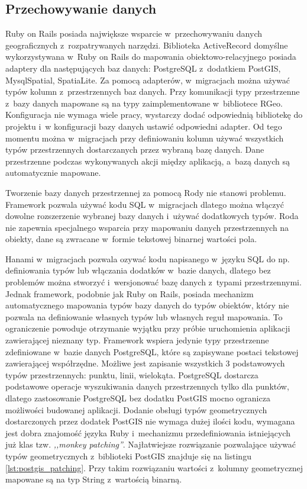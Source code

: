 \documentclass[printmode]{mgr}
\begin{document}
\subsection{Przechowywanie danych}

 Ruby on Rails posiada największe wsparcie w~przechowywaniu danych geograficznych z~rozpatrywanych narzędzi. Biblioteka ActiveRecord domyślne wykorzystywana w~Ruby on Rails do mapowania obiektowo-relacyjnego posiada adaptery dla następujących baz danych: PostgreSQL z~dodatkiem PostGIS, MysqlSpatial, SpatiaLite. Za pomocą adapterów, w~migracjach można używać typów kolumn z~przestrzennych baz danych. Przy komunikacji typy przestrzenne z~bazy danych mapowane są na typy zaimplementowane w~bibliotece RGeo. Konfiguracja nie wymaga wiele pracy, wystarczy dodać odpowiednią bibliotekę do projektu i~w konfiguracji bazy danych ustawić odpowiedni adapter. Od tego momentu można w~migracjach przy definiowaniu kolumn używać wszystkich typów przestrzennych dostarczanych przez wybraną bazę danych. Dane przestrzenne podczas wykonywanych akcji między aplikacją, a~bazą danych są automatycznie mapowane.

 Tworzenie bazy danych przestrzennej za pomocą Rody nie stanowi problemu. Framework pozwala używać kodu SQL w~migracjach dlatego można włączyć dowolne rozszerzenie wybranej bazy danych i~używać dodatkowych typów. Roda nie zapewnia specjalnego wsparcia przy mapowaniu danych przestrzennych na obiekty, dane są zwracane w~formie tekstowej binarnej wartości pola.

 Hanami w~migracjach pozwala ozywać kodu napisanego w~języku SQL do np. definiowania typów lub włączania dodatków w~bazie danych, dlatego bez problemów można stworzyć i~wersjonować bazę danych z~typami przestrzennymi. Jednak framework, podobnie jak Ruby on Rails, posiada mechanizm automatycznego mapowania typów bazy danych do typów obiektów, który nie pozwala na definiowanie własnych typów lub własnych reguł mapowania. To ograniczenie powoduje otrzymanie wyjątku przy próbie uruchomienia aplikacji zawierającej nieznany typ. Framework wspiera jedynie typy przestrzenne zdefiniowane w~bazie danych PostgreSQL, które są zapisywane postaci tekstowej zawierającej współrzędne. Możliwe jest zapisanie wszystkich 3 podstawowych typów przestrzennych: punktu, linii, wielokąta. PostgreSQL dostarcza podstawowe operacje wyszukiwania danych przestrzennych tylko dla punktów, dlatego zastosowanie PostgreSQL bez dodatku PostGIS mocno ogranicza możliwości budowanej aplikacji. Dodanie obsługi typów geometrycznych dostarczonych przez dodatek PostGIS nie wymaga dużej ilości kodu, wymagana jest dobra znajomość języka Ruby i~mechanizmu przedefiniowania istniejących już klas tzw. \textit{,,monkey patching''}. Najłatwiejsze rozwiązanie pozwalające używać typów geometrycznych z~biblioteki PostGIS znajduje się na listingu \ref{lst:postgis_patching}. Przy takim rozwiązaniu wartości z~kolumny geometrycznej mapowane są na typ String z~wartością binarną.
\end{document}
